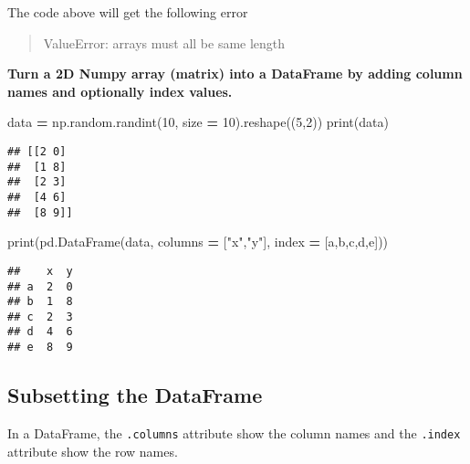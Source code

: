 \documentclass[
]{book}
\newenvironment{Shaded}{\begin{snugshade}}{\end{snugshade}}
\newcommand{\BuiltInTok}[1]{#1}
\newcommand{\DecValTok}[1]{\textcolor[rgb]{0.00,0.00,0.81}{#1}}
\newcommand{\NormalTok}[1]{#1}
\newcommand{\OperatorTok}[1]{\textcolor[rgb]{0.81,0.36,0.00}{\textbf{#1}}}
\newcommand{\StringTok}[1]{\textcolor[rgb]{0.31,0.60,0.02}{#1}}
\begin{document}
The code above will get the following error

\begin{quote}
ValueError: arrays must all be same length
\end{quote}

\textbf{Turn a 2D Numpy array (matrix) into a DataFrame by adding column names and optionally
index values.}

\begin{Shaded}
\begin{Highlighting}[]
\NormalTok{data }\OperatorTok{=}\NormalTok{ np.random.randint(}\DecValTok{10}\NormalTok{, size }\OperatorTok{=} \DecValTok{10}\NormalTok{).reshape((}\DecValTok{5}\NormalTok{,}\DecValTok{2}\NormalTok{))}
\BuiltInTok{print}\NormalTok{(data)}
\end{Highlighting}
\end{Shaded}

\begin{verbatim}
## [[2 0]
##  [1 8]
##  [2 3]
##  [4 6]
##  [8 9]]
\end{verbatim}

\begin{Shaded}
\begin{Highlighting}[]
\BuiltInTok{print}\NormalTok{(pd.DataFrame(data, columns }\OperatorTok{=}\NormalTok{ [}\StringTok{"x"}\NormalTok{,}\StringTok{"y"}\NormalTok{], index }\OperatorTok{=}\NormalTok{ [}\StringTok{\textquotesingle{}a\textquotesingle{}}\NormalTok{,}\StringTok{\textquotesingle{}b\textquotesingle{}}\NormalTok{,}\StringTok{\textquotesingle{}c\textquotesingle{}}\NormalTok{,}\StringTok{\textquotesingle{}d\textquotesingle{}}\NormalTok{,}\StringTok{\textquotesingle{}e\textquotesingle{}}\NormalTok{]))}
\end{Highlighting}
\end{Shaded}

\begin{verbatim}
##    x  y
## a  2  0
## b  1  8
## c  2  3
## d  4  6
## e  8  9
\end{verbatim}

\hypertarget{subsetting-the-dataframe}{%
\subsection{Subsetting the DataFrame}\label{subsetting-the-dataframe}}

In a DataFrame, the \texttt{.columns} attribute show the column names and the \texttt{.index} attribute
show the row names.
\end{document}
